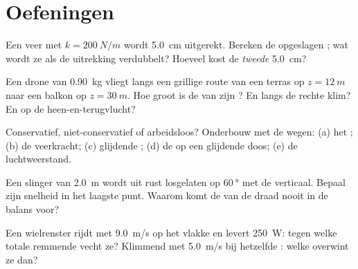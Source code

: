 \section{Oefeningen}

\begin{exercise}[$\star$]\label{exo:g12:work-and-energy:1}
Een veer met  $k = \qty{200}{N/m}$ wordt \qty{5.0}{cm}
uitgerekt. Bereken de opgeslagen ; wat wordt ze als de uitrekking
verdubbelt? Hoeveel kost de \emph{tweede} \qty{5.0}{cm}?
\end{exercise}

\begin{exercise}[$\star$]\label{exo:g12:work-and-energy:2}
Een drone van \qty{0.90}{kg} vliegt langs een grillige route van een terras op
$z = \qty{12}{m}$ naar een balkon op $z = \qty{30}{m}$. Hoe groot is de 
van zijn ? En langs de rechte klim? En op de heen-en-terugvlucht?
\end{exercise}

\begin{exercise}[$\star$]\label{exo:g12:work-and-energy:3}
Conservatief, niet-conservatief of arbeidsloos? Onderbouw met de wegen:
(a) het ; (b) de veerkracht; (c) glijdende ; (d) de
 op een glijdende doos; (e) de luchtweerstand.
\end{exercise}

\begin{exercise}[$\star$]\label{exo:g12:work-and-energy:4}
Een slinger van \qty{2.0}{m} wordt uit rust losgelaten op
$\qty{60}{\degree}$ met de verticaal. Bepaal zijn snelheid in het laagste
punt. Waarom komt de  van de draad nooit in de balans voor?
\end{exercise}

\begin{exercise}[$\star$]\label{exo:g12:work-and-energy:5}
Een wielrenster rijdt met \qty{9.0}{m/s} op het vlakke en levert
\qty{250}{W}: tegen welke totale remmende  vecht ze? Klimmend met
\qty{5.0}{m/s} bij hetzelfde : welke  overwint ze dan?
\end{exercise}

